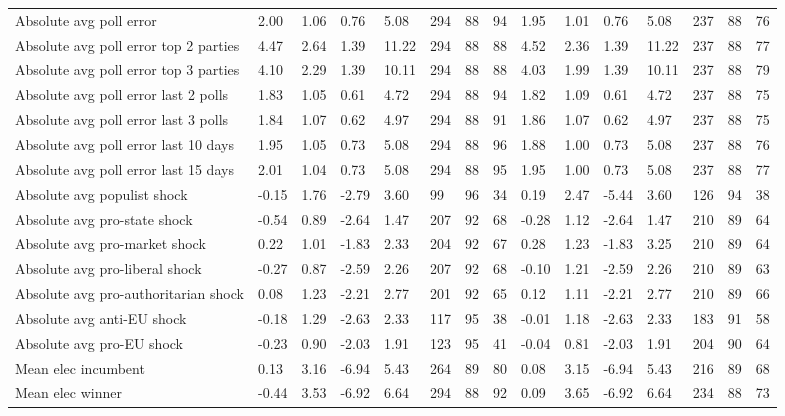 \begin{longtable}{lllllllllllllll}
Absolute avg poll error & 2.00 & 1.06 & 0.76 & 5.08 & 294 & 88 & 94 & 1.95 & 1.01 & 0.76 & 5.08 & 237 & 88 & 76\\
Absolute avg poll error top 2 parties & 4.47 & 2.64 & 1.39 & 11.22 & 294 & 88 & 88 & 4.52 & 2.36 & 1.39 & 11.22 & 237 & 88 & 77\\
Absolute avg poll error top 3 parties & 4.10 & 2.29 & 1.39 & 10.11 & 294 & 88 & 88 & 4.03 & 1.99 & 1.39 & 10.11 & 237 & 88 & 79\\
\addlinespace
Absolute avg poll error last 2 polls & 1.83 & 1.05 & 0.61 & 4.72 & 294 & 88 & 94 & 1.82 & 1.09 & 0.61 & 4.72 & 237 & 88 & 75\\
Absolute avg poll error last 3 polls & 1.84 & 1.07 & 0.62 & 4.97 & 294 & 88 & 91 & 1.86 & 1.07 & 0.62 & 4.97 & 237 & 88 & 75\\
Absolute avg poll error last 10 days & 1.95 & 1.05 & 0.73 & 5.08 & 294 & 88 & 96 & 1.88 & 1.00 & 0.73 & 5.08 & 237 & 88 & 76\\
Absolute avg poll error last 15 days & 2.01 & 1.04 & 0.73 & 5.08 & 294 & 88 & 95 & 1.95 & 1.00 & 0.73 & 5.08 & 237 & 88 & 77\\
Absolute avg populist shock & -0.15 & 1.76 & -2.79 & 3.60 & 99 & 96 & 34 & 0.19 & 2.47 & -5.44 & 3.60 & 126 & 94 & 38\\
\addlinespace
Absolute avg pro-state shock & -0.54 & 0.89 & -2.64 & 1.47 & 207 & 92 & 68 & -0.28 & 1.12 & -2.64 & 1.47 & 210 & 89 & 64\\
Absolute avg pro-market shock & 0.22 & 1.01 & -1.83 & 2.33 & 204 & 92 & 67 & 0.28 & 1.23 & -1.83 & 3.25 & 210 & 89 & 64\\
Absolute avg pro-liberal shock & -0.27 & 0.87 & -2.59 & 2.26 & 207 & 92 & 68 & -0.10 & 1.21 & -2.59 & 2.26 & 210 & 89 & 63\\
Absolute avg pro-authoritarian shock & 0.08 & 1.23 & -2.21 & 2.77 & 201 & 92 & 65 & 0.12 & 1.11 & -2.21 & 2.77 & 210 & 89 & 66\\
Absolute avg anti-EU shock & -0.18 & 1.29 & -2.63 & 2.33 & 117 & 95 & 38 & -0.01 & 1.18 & -2.63 & 2.33 & 183 & 91 & 58\\
\addlinespace
Absolute avg pro-EU shock & -0.23 & 0.90 & -2.03 & 1.91 & 123 & 95 & 41 & -0.04 & 0.81 & -2.03 & 1.91 & 204 & 90 & 64\\
Mean elec incumbent & 0.13 & 3.16 & -6.94 & 5.43 & 264 & 89 & 80 & 0.08 & 3.15 & -6.94 & 5.43 & 216 & 89 & 68\\
Mean elec winner & -0.44 & 3.53 & -6.92 & 6.64 & 294 & 88 & 92 & 0.09 & 3.65 & -6.92 & 6.64 & 234 & 88 & 73\\

\end{longtable}
